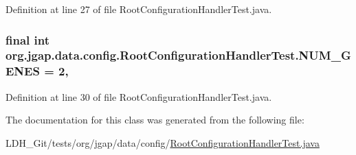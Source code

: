 Definition at line 27 of file Root\-Configuration\-Handler\-Test.\-java.

\hypertarget{classorg_1_1jgap_1_1data_1_1config_1_1_root_configuration_handler_test_a78b235e16964722e46bffd19c656bba4}{
\subsubsection[{N\-U\-M\-\_\-\-G\-E\-N\-E\-S}]{\setlength{\rightskip}{0pt plus 5cm}final int org.\-jgap.\-data.\-config.\-Root\-Configuration\-Handler\-Test.\-N\-U\-M\-\_\-\-G\-E\-N\-E\-S = 2\hspace{0.3cm}{\ttfamily [static]}, {\ttfamily [private]}}}\label{classorg_1_1jgap_1_1data_1_1config_1_1_root_configuration_handler_test_a78b235e16964722e46bffd19c656bba4}


Definition at line 30 of file Root\-Configuration\-Handler\-Test.\-java.



The documentation for this class was generated from the following file\-:\begin{DoxyCompactItemize}
\item 
L\-D\-H\-\_\-\-Git/tests/org/jgap/data/config/\hyperlink{_root_configuration_handler_test_8java}{Root\-Configuration\-Handler\-Test.\-java}\end{DoxyCompactItemize}
